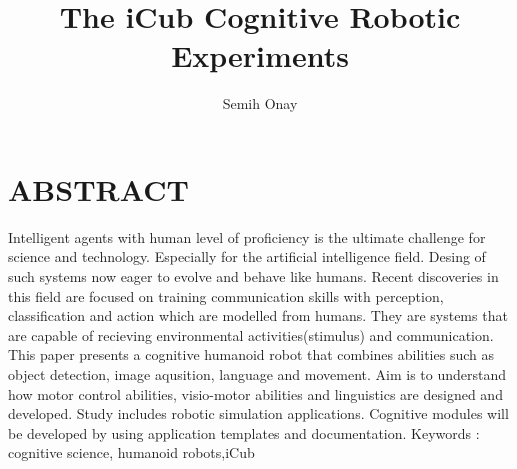 \documentclass[a4paper, 11pt]{report}
\title{The iCub Cognitive Robotic Experiments}
\author{Semih Onay}
\makeatletter
\renewcommand\tableofcontents{
\hfill\textbf{\Large\contentsname}\hfill\null\par
\@mkboth{\MakeUppercase\contentsname}{\MakeUppercase\contentsname}%
\@starttoc{toc}
}
\makeatother
\begin{document}
\makecstitle
\tableofcontents
\listoffigures

\begin{symabbreviations}
\end{symabbreviations}
\chapter{ABSTRACT}
Intelligent agents with human level of proficiency is the ultimate challenge 
for science and technology. Especially for the artificial intelligence field. 
Desing of such systems now eager to evolve and behave like humans. 
Recent discoveries in this field are focused on training  communication 
skills with perception, classification and action which are modelled from 
humans. They are systems that are capable of recieving environmental 
activities(stimulus) and communication. This paper presents a cognitive 
humanoid robot that combines abilities such as object detection, image 
aqusition, language and movement. Aim is to understand how motor control 
abilities, visio-motor abilities and linguistics are designed and developed. 
Study includes robotic simulation applications. Cognitive modules will be 
developed by using application templates and documentation.
\linebreak
Keywords : cognitive science, humanoid robots,iCub
\end{document}
